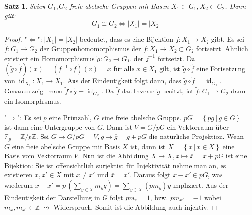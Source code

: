 \documentclass[12pt]{scrartcl} %
\newtheorem{thm}{Satz}[section]
\theoremstyle{definition}
\theoremstyle{remark}
\begin{document}
\begin{thm}
  Seien $G_1, G_2$ freie abelsche Gruppen mit Basen $X_1 \subset G_1, X_2 \subset G_2$. Dann gilt:
  \[ G_1 \cong G_2 \iff \lvert X_1 \rvert = \lvert X_2 \rvert \]
\end{thm}
\begin{proof}
  "$\Leftarrow$": $\lvert X_1 \rvert = \lvert X_2 \rvert$ bedeutet, dass es eine Bijektion $f: X_1 \to X_2$ gibt. Es sei $\tilde{f}: G_1 \to G_2 $ der Gruppenhomomorphismus der $f : X_1 \to X_2 \subset G_2$ fortsetzt.
  Ähnlich existiert ein Homomorphismus $\tilde{g}: G_2 \to G_1$, der $f^{-1}$ fortsetzt. Da $(\tilde{g} \circ \tilde{f})(x) = (f^{-1} \circ f)(x) = x $ für alle $x \in X_1$ gilt, ist $\tilde{g} \circ \tilde{f} $ eine Fortsetzung von $\operatorname{id}_{X_1} : X_1 \to X_1$. Aus der Eindeutigkeit folgt dann, dass $\tilde{g} \circ \tilde{f} = \operatorname{id}_{G_1}$. Genauso zeigt man: $\tilde{f} \circ \tilde{g} = \operatorname{id}_{G_2}$. Da $\tilde{f}$ das Inverse $\tilde{g}$ besitzt, ist $\tilde{f}: G_1 \to G_2$ dann ein Isomorphismus.

  "$\Rightarrow$": Es sei $p $ eine Primzahl, $G$ eine freie abelsche Gruppe. 
  $pG = \left\{ pg \,\vert\, g \in G \right\}$ ist dann eine Untergruppe von $G$. 
  Dann ist $V = G / pG$ ein Vektorraum über $\mathbb{F}_p = \mathbb{Z}/p\mathbb{Z}$. 
  Sei $G \to G/pG = V, g\mapsto \overline{g} = g + pG$  die natürliche Projektion. 
  Wenn $G$ eine freie abelsche Gruppe mit Basis $X$ ist, dann ist $ \overline{X} = \left\{ \overline{x} \,\vert\, x \in X \right\} $ eine Basis vom Vektorraum $V$. 
  Nun ist die Abbildung $X \to \overline{X}, x \mapsto \overline{x} = x + pG$ ist eine Bijektion: Sie ist offensichtlich surjektiv; 
  für Injektivität nehme man an, es existieren $x, x' \in X$ mit $x \neq x'$ und $\overline{x} = \overline{x'}$. 
  Daraus folgt $ x - x' \in pG$, was wiederum $x - x' = p \, ( \sum_{y \in X} m_y y )  = \sum_{y \in X} \left( p m_y \right) y $ impliziert. 
  Aus der Eindeutigkeit der Darstellung in $G$ folgt $p m_x = 1$, bzw. $p m_{x'} = -1$ wobei $m_x, m_{x'} \in \mathbb{Z}$ $\leadsto$  Widerspruch. Somit ist die Abbildung auch injektiv.
\end{proof}




\end{document}
